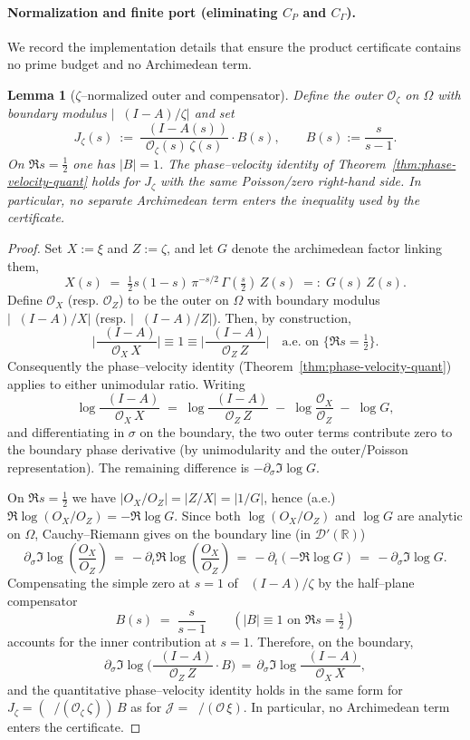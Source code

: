 \documentclass[11pt]{article}
\newtheorem{lemma}[theorem]{Lemma}
\theoremstyle{definition}
\theoremstyle{remark}
\theoremstyle{definition}
\newcommand{\R}{\mathbb{R}}
\DeclareMathOperator{\dettwo}{det_2}
\begin{document}
\paragraph{Normalization and finite port (eliminating $C_P$ and $C_\Gamma$).}
We record the implementation details that ensure the product certificate contains no prime budget and no Archimedean term.

\begin{lemma}[\(\zeta\)–normalized outer and compensator]\label{lem:zeta-normalization}
Define the outer $\mathcal O_\zeta$ on $\Omega$ with boundary modulus $\big|\dettwo(I-A)/\zeta\big|$ and set
\[ J_\zeta(s)\ :=\ \frac{\dettwo(I-A(s))}{\mathcal O_\zeta(s)\,\zeta(s)}\cdot B(s),\qquad B(s):=\frac{s}{s-1}. \]
On $\Re s=\tfrac12$ one has $|B|=1$. The phase–velocity identity of Theorem~\ref{thm:phase-velocity-quant} holds for $J_\zeta$ with the same Poisson/zero right-hand side. In particular, no separate Archimedean term enters the inequality used by the certificate.
\end{lemma}

\begin{proof}
Set $X:=\xi$ and $Z:=\zeta$, and let $G$ denote the archimedean factor linking them,
\[
  X(s)\;=\;\tfrac12 s(1{-}s)\,\pi^{-s/2}\,\Gamma(\tfrac s2)\,Z(s)\;=:\;G(s)\,Z(s).
\]
Define $\mathcal O_X$ (resp. $\mathcal O_Z$) to be the outer on $\Omega$ with boundary modulus $\big|\dettwo(I{-}A)/X\big|$ (resp. $\big|\dettwo(I{-}A)/Z\big|$). Then, by construction,
\[
  \Big|\frac{\dettwo(I{-}A)}{\mathcal O_X\,X}\Big|\equiv 1\equiv \Big|\frac{\dettwo(I{-}A)}{\mathcal O_Z\,Z}\Big|\quad \text{a.e. on }\{\Re s=\tfrac12\}.
\]
Consequently the phase–velocity identity (Theorem~\ref{thm:phase-velocity-quant}) applies to either unimodular ratio. Writing
\[
  \log \frac{\dettwo(I{-}A)}{\mathcal O_X\,X}
  \;=\; \log \frac{\dettwo(I{-}A)}{\mathcal O_Z\,Z}\; -\; \log\frac{\mathcal O_X}{\mathcal O_Z}\; -\; \log G,
\]
and differentiating in $\sigma$ on the boundary, the two outer terms contribute zero to the boundary phase derivative (by unimodularity and the outer/Poisson representation). The remaining difference is $-\partial_\sigma\Im\log G$.

On $\Re s=\tfrac12$ we have $|O_X/O_Z|=|Z/X|=|1/G|$, hence (a.e.) $\Re\log(O_X/O_Z)=-\Re\log G$. Since both $\log(O_X/O_Z)$ and $\log G$ are analytic on $\Omega$, Cauchy–Riemann gives on the boundary line (in $\mathcal D'(\R)$)
\[
  \partial_\sigma\Im\log\!\left(\frac{O_X}{O_Z}\right)
  \,=\,-\partial_t\Re\log\!\left(\frac{O_X}{O_Z}\right)
  \,=\,-\partial_t(-\Re\log G)
  \,=\,-\partial_\sigma\Im\log G.
\]
Compensating the simple zero at $s=1$ of $\dettwo(I-A)/\zeta$ by the half–plane compensator
\[
  B(s)\;=\;\frac{s}{s-1}\qquad(|B|\equiv 1\text{ on }\Re s=\tfrac12)
\]
accounts for the inner contribution at $s=1$. Therefore, on the boundary,
\[
  \partial_\sigma\Im\log\!\Big(\frac{\dettwo(I{-}A)}{\mathcal O_Z\,Z}\cdot B\Big)
  \,=\, \partial_\sigma\Im\log\frac{\dettwo(I{-}A)}{\mathcal O_X\,X},
\]
and the quantitative phase–velocity identity holds in the same form for $J_\zeta=(\dettwo/(\mathcal O_\zeta\,\zeta))\,B$ as for $\mathcal J=\dettwo/(\mathcal O\,\xi)$. In particular, no Archimedean term enters the certificate.
\end{proof}
\end{document}
